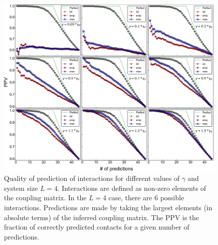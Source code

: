 \documentclass[preprint,amsmath,amssymb,superscriptaddress,showpacs,pre]{revtex4-1}
\begin{document}
  
\begin{figure}[!htb]
	\centering
	\includegraphics[keepaspectratio=true,width=1.0\textwidth]{Figures/PPVs_L10.pdf}
	\caption{Quality of prediction of interactions for  different values of $\gamma$ and system size $L=4$. Interactions are defined as non-zero elements of the coupling matrix. In the $L=4$ case, there are $6$ possible interactions. Predictions are made by taking the largest elements (in absolute terms) of the inferred coupling matrix. The PPV is the fraction of correctly predicted contacts for a given number of predictions.}
	\label{fig:PPV_L10}
\end{figure}
\end{document}
